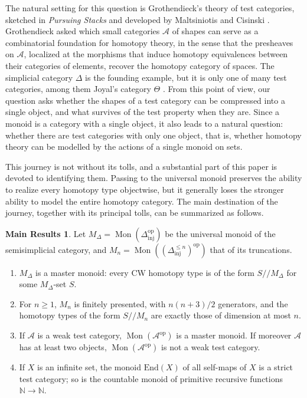 \documentclass[11pt]{amsart}
\theoremstyle{definition}
\newtheorem*{mainthm}{Main Results}
\theoremstyle{remark}
\numberwithin{figure}{section}%
\DeclareMathOperator{\Mon}{Mon}
\newcommand{\Dinj}{\Delta_{\mathrm{inj}}}
\newcommand{\op}{\mathrm{op}}
\newcommand{\A}{\mathcal{A}}
\begin{document}
The natural setting for this question is Grothendieck's theory of test categories, sketched in \emph{Pursuing Stacks} \cite{PS} and developed by Maltsiniotis and Cisinski \cite{Malt,Cis}. Grothendieck asked which small categories $\A$ of shapes can serve as a combinatorial foundation for homotopy theory, in the sense that the presheaves on $\A$, localized at the morphisms that induce homotopy equivalences between their categories of elements, recover the homotopy category of spaces. The simplicial category $\Delta$ is the founding example, but it is only one of many test categories, among them Joyal's category $\Theta$ \cite{CM}. From this point of view, our question asks whether the shapes of a test category can be compressed into a single object, and what survives of the test property when they are. Since a monoid is a category with a single object, it also leads to a natural question: whether there are test categories with only one object, that is, whether homotopy theory can be modelled by the actions of a single monoid on sets.

This journey is not without its tolls, and a substantial part of this paper is devoted to identifying them. Passing to the universal monoid preserves the ability to realize every homotopy type objectwise, but it generally loses the stronger ability to model the entire homotopy category. The main destination of the journey, together with its principal tolls, can be summarized as follows.

\begin{mainthm}
Let $M_\Delta=\Mon(\Dinj^{\op})$ be the universal monoid of the semisimplicial category, and $M_n=\Mon((\Dinj^{\leq n})^{\op})$ that of its truncations.
\begin{enumerate}
\item $M_\Delta$ is a master monoid: every CW homotopy type is of the form $S/\!/M_\Delta$ for some $M_\Delta$-set $S$.
\item For $n\geq1$, $M_n$ is finitely presented, with $n(n+3)/2$ generators, and the homotopy types of the form $S/\!/M_n$ are exactly those of dimension at most $n$.
\item If $\A$ is a weak test category, $\Mon(\A^{\op})$ is a master monoid. If moreover $\A$ has at least two objects, $\Mon(\A^{\op})$ is not a weak test category.
\item If $X$ is an infinite set, the monoid $\mathrm{End}(X)$ of all self-maps of $X$ is a strict test category; so is the countable monoid of primitive recursive functions $\mathbb N\to\mathbb N$.
\end{enumerate}
\end{mainthm}
\end{document}
